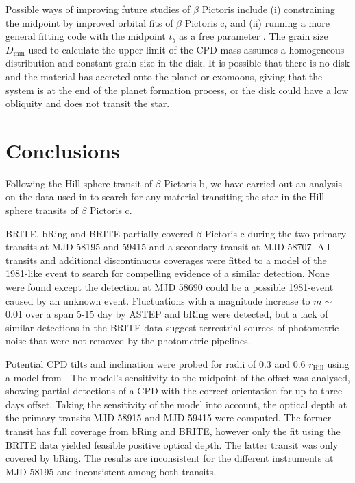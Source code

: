 \documentclass{aa}
\newcommand\picb{$\beta$ Pictoris b}
\newcommand\picc{$\beta$ Pictoris c}
\newcommand\pic{$\beta$ Pictoris}
\begin{document}
Possible ways of improving future studies of \pic{} include (i) constraining the midpoint by improved orbital fits of \picc{}, and (ii) running a more general fitting code with the midpoint $t_b$ as a free parameter \citep[e.g. \texttt{emcee}; ][]{Foreman-Mackey_2013}.
%
The grain size $D_{\text{min}}$ used to calculate the upper limit of the CPD mass assumes a homogeneous distribution and constant grain size in the disk. 
%
It is possible that there is no disk and the material has accreted onto the planet or exomoons, giving that the system is at the end of the planet formation process, or the disk could have a low obliquity and does not transit the star. 

\section{Conclusions}\label{sect:conc}
Following the Hill sphere transit of \picb{}, we have carried out an analysis on the data used in \citet{Kenworthy_2021} to search for any material transiting the star in the Hill sphere transits of \picc{}.

BRITE, bRing and BRITE partially covered \picc{} during the two primary transits at MJD 58195 and 59415 and a secondary transit at MJD 58707.
%
All transits and additional discontinuous coverages were fitted to a model of the 1981-like event to search for compelling evidence of a similar detection.
%
None were found except the detection at MJD 58690 could be a possible 1981-event caused by an unknown event.
%
Fluctuations with a magnitude increase to $m \sim$ 0.01 over a span 5-15 day by ASTEP and bRing were detected, but a lack of similar detections in the BRITE data suggest terrestrial sources of photometric noise that were not removed by the photometric pipelines.

Potential CPD tilts and inclination were probed for radii of 0.3 and 0.6 $r_{\text{Hill}}$ using a model from \citet{Kenworthy_2021}.
%
The model's sensitivity to the midpoint of the offset was analysed, showing partial detections of a CPD with the correct orientation for up to three days offset.
%
Taking the sensitivity of the model into account, the optical depth at the primary transits MJD 58915 and MJD 59415 were computed.
%
The former transit has full coverage from bRing and BRITE, however only the fit using the BRITE data yielded feasible positive optical depth.
%
The latter transit was only covered by bRing.
%
The results are inconsistent for the different instruments at MJD 58195 and inconsistent among both transits.
\end{document}
